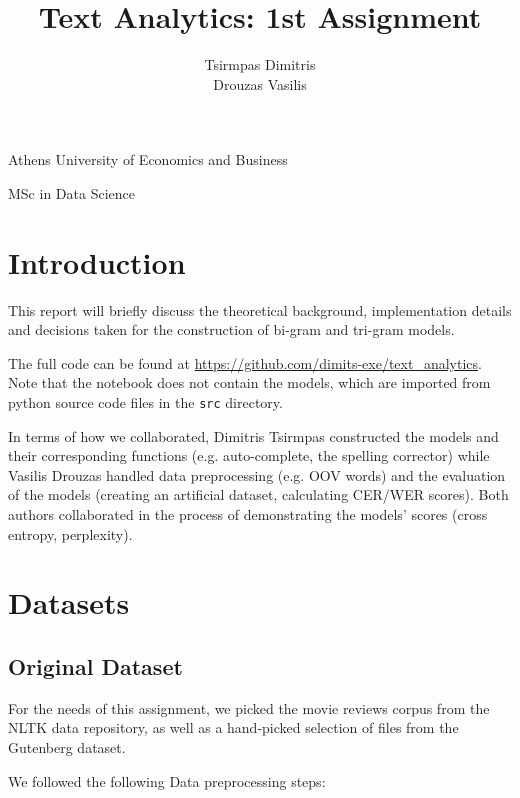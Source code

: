 \documentclass[11pt, a4paper]{article}
\title{\Huge Text Analytics: 1st Assignment}
\author{\LARGE Tsirmpas Dimitris\\\LARGE Drouzas Vasilis}
\begin{document}
	
	\begin{titlepage}
		\maketitle
		\begin{center}
			
			\large Athens University of Economics and Business
			
			\large MSc in Data Science
			
		\end{center}
		
	\end{titlepage}
	
	\tableofcontents
	\newpage	
	
	\section{Introduction}
	
	This report will briefly discuss the theoretical background, implementation details and decisions taken for the construction of bi-gram and tri-gram models.
	
 
	The full code can be found at \url{https://github.com/dimits-exe/text_analytics}. Note that the notebook does not contain the models, which are imported from python source code files in the \texttt{src} directory.

    In terms of how we collaborated, Dimitris Tsirmpas constructed the models and their corresponding functions (e.g. auto-complete, the spelling corrector) while Vasilis Drouzas handled data preprocessing (e.g. OOV words) and the evaluation of the models (creating an artificial dataset, calculating CER/WER scores). Both authors collaborated in the process of demonstrating the models' scores (cross entropy, perplexity). 
	
	\section{Datasets}
	
	
	\subsection{Original Dataset}
	
	For the needs of this assignment, we picked the movie reviews corpus from the NLTK data repository, as well as a hand-picked selection of files from the Gutenberg dataset. 
	
	We followed the following Data preprocessing steps:
	
\end{document}
